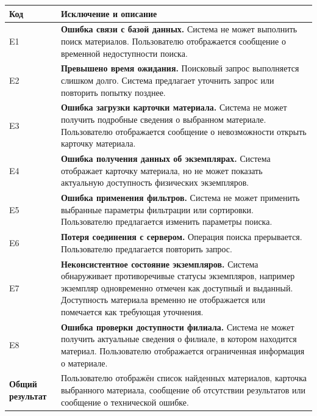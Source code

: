 \documentclass[12pt,a4paper]{article}
\begin{document}
\begin{xltabular}{\textwidth}{
			|>{\raggedright\arraybackslash}p{2.7cm}
			|>{\raggedright\arraybackslash}X|
		}
		
		\textbf{Код} & \textbf{Исключение и описание} \\
		\hline
		
		E1 &
		\textbf{Ошибка связи с базой данных.}
		Система не может выполнить поиск материалов. Пользователю отображается
		сообщение о временной недоступности поиска. \\
		\hline
		
		E2 &
		\textbf{Превышено время ожидания.}
		Поисковый запрос выполняется слишком долго. Система предлагает уточнить
		запрос или повторить попытку позднее. \\
		\hline
		
		E3 &
		\textbf{Ошибка загрузки карточки материала.}
		Система не может получить подробные сведения о выбранном материале.
		Пользователю отображается сообщение о невозможности открыть карточку
		материала. \\
		\hline
		
		E4 &
		\textbf{Ошибка получения данных об экземплярах.}
		Система отображает карточку материала, но не может показать актуальную
		доступность физических экземпляров. \\
		\hline
		
		E5 &
		\textbf{Ошибка применения фильтров.}
		Система не может применить выбранные параметры фильтрации или
		сортировки. Пользователю предлагается изменить параметры поиска. \\
		\hline
		
		E6 &
		\textbf{Потеря соединения с сервером.}
		Операция поиска прерывается. Пользователю предлагается повторить запрос. \\
		\hline
		
		E7 &
		\textbf{Неконсистентное состояние экземпляров.}
		Система обнаруживает противоречивые статусы экземпляров, например
		экземпляр одновременно отмечен как доступный и выданный. Доступность
		материала временно не отображается или помечается как требующая
		уточнения. \\
		\hline
		
		E8 &
		\textbf{Ошибка проверки доступности филиала.}
		Система не может получить актуальные сведения о филиале, в котором
		находится материал. Пользователю отображается ограниченная информация
		о материале. \\
		\hline
		
		
		\textbf{Общий результат} &
		Пользователю отображён список найденных материалов, карточка
		выбранного материала, сообщение об отсутствии результатов или
		сообщение о технической ошибке. \\
		\hline
		

\end{xltabular}
\end{document}
